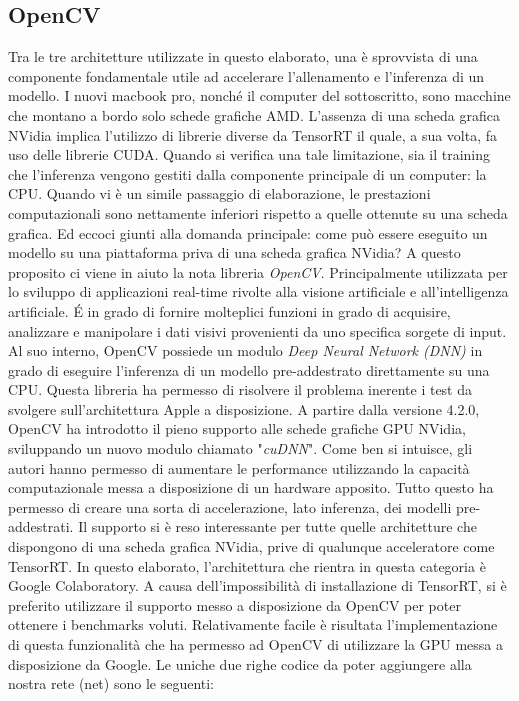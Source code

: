 \subsection{OpenCV}
Tra le tre architetture utilizzate in questo elaborato, una è sprovvista di una componente fondamentale utile ad accelerare l'allenamento e l'inferenza di un modello. I nuovi macbook pro, nonché il computer del sottoscritto, sono macchine che montano a bordo solo schede grafiche AMD. L'assenza di una scheda grafica NVidia implica l'utilizzo di librerie diverse da TensorRT il quale, a sua volta, fa uso delle librerie CUDA. Quando si verifica una tale limitazione, sia il training che l'inferenza vengono gestiti dalla componente principale di un computer: la CPU. Quando vi è un simile passaggio di elaborazione, le prestazioni computazionali sono nettamente inferiori rispetto a quelle ottenute su una scheda grafica. Ed eccoci giunti alla domanda principale: come può essere eseguito un modello su una piattaforma priva di una scheda grafica NVidia? A questo proposito ci viene in aiuto la nota libreria \emph{OpenCV}.
Principalmente utilizzata per lo sviluppo di applicazioni real-time rivolte alla visione artificiale e all'intelligenza artificiale. É in grado di fornire molteplici funzioni in grado di acquisire, analizzare e manipolare i dati visivi provenienti da uno specifica sorgete di input. Al suo interno, OpenCV possiede un modulo \emph{Deep Neural Network (DNN)} in grado di eseguire l'inferenza di un modello pre-addestrato direttamente su una CPU.
Questa libreria ha permesso di risolvere il problema inerente i test da svolgere sull'architettura Apple a disposizione. A partire dalla versione 4.2.0, OpenCV ha introdotto il pieno supporto alle schede grafiche GPU NVidia, sviluppando un nuovo modulo chiamato "\emph{cuDNN}".
Come ben si intuisce, gli autori hanno permesso di aumentare le performance utilizzando la capacità computazionale messa a disposizione di un hardware apposito. Tutto questo ha permesso di creare una sorta di accelerazione, lato inferenza, dei modelli pre-addestrati. Il supporto si è reso interessante per tutte quelle architetture che dispongono di una scheda grafica NVidia, prive di qualunque acceleratore come TensorRT. In questo elaborato, l'architettura che rientra in questa categoria è Google Colaboratory. A causa dell'impossibilità di installazione di TensorRT, si è preferito utilizzare il supporto messo a disposizione da OpenCV per poter ottenere i benchmarks voluti. Relativamente facile è risultata l'implementazione di questa funzionalità che ha permesso ad OpenCV di utilizzare la GPU messa a disposizione da Google. Le uniche due righe codice da poter aggiungere alla nostra rete (net) sono le seguenti:
